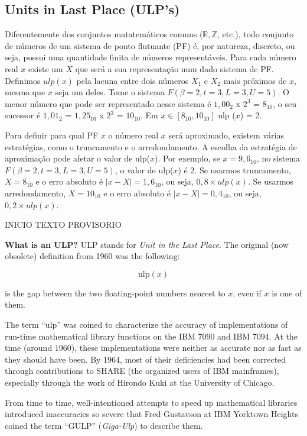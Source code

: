 \subsection{Units in Last Place (ULP's)}
Diferentemente dos conjuntos matatemáticos comuns ($\mathbb{R}, \mathbb{Z}$,
etc.), todo conjunto de números de um sistema de ponto flutuante (PF) é, por
natureza, discreto, ou seja, possui uma quantidade finita de números
representáveis. Para cada número real $x$ existe um $X$ que será a sua
representação num dado sistema de PF. Definimos $ulp(x)$ pela lacuna entre dois
números $X_{1}$ e $X_{2}$ mais próximos de $x$, mesmo que $x$ seja um deles.
Tome o sistema $F(\beta = 2, t = 3, L = 3 , U = 5)$. O menor número que pode
ser representado nesse sistema é $1{,}00_{2}$ x $2^{3}$ = $8_{10}$, o seu
sucessor é $1{,}01_{2}$ = $1{,}25_{10}$ x $2^{3}$ = $10_{10}$. Em $x \in
  [8_{10} , 10_{10}]$ ulp ($x$) = 2.

Para definir para qual PF $x$ o número real $x$ será aproximado, existem várias
estratégias, como o truncamento e o arredondamento. A escolha da estratégia de
aproximação pode afetar o valor de ulp($x$). Por exemplo, se $x = 9{,}6_{10}$,
no sistema $F(\beta = 2, t = 3, L = 3 , U = 5)$, o valor de ulp($x$) é 2. Se
usarmos truncamento, $X = 8_{10}$ e o erro absoluto é $|x - X| = 1{,}6_{10}$,
ou seja, $0{,}8 \times ulp(x)$. Se usarmos arredondamento, $X = 10_{10}$ e o
erro absoluto é $|x - X| = 0{,}4_{10}$, ou seja, $0{,}2 \times ulp(x)$.

INICIO TEXTO PROVISORIO

\textbf{What is an ULP?} ULP stands for \textit{Unit in the Last Place}.
The original (now obsolete) definition from 1960 was the following:

\begin{equation}
  \mathrm{ulp}(x)
\end{equation}

is the gap between the two floating-point numbers nearest to $x$, even if $x$
is one of them.

The term ``ulp'' was coined to characterize the accuracy of implementations of
run-time mathematical library functions on the IBM 7090 and IBM 7094. At the
time (around 1960), these implementations were neither as accurate nor as fast
as they should have been. By 1964, most of their deficiencies had been
corrected through contributions to SHARE (the organized users of IBM
mainframes), especially through the work of Hirondo Kuki at the University of
Chicago.

From time to time, well-intentioned attempts to speed up mathematical libraries
introduced inaccuracies so severe that Fred Gustavson at IBM Yorktown Heights
coined the term ``GULP'' (\textit{Giga-Ulp}) to describe them.

